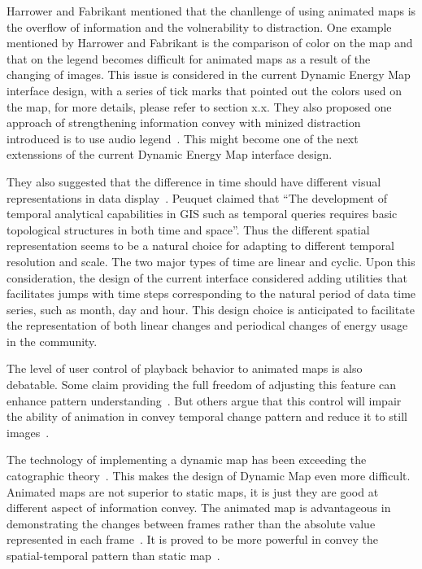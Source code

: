 \documentclass[hidelinks,12pt]{article}
\begin{document}
Harrower and Fabrikant mentioned that the chanllenge of using animated
maps is the overflow of information and the volnerability to
distraction. One example mentioned by Harrower and Fabrikant is the
comparison of color on the map and that on the legend becomes
difficult for animated maps as a result of the changing of
images. This issue is considered in the current Dynamic Energy Map
interface design, with a series of tick marks that pointed out the
colors used on the map, for more details, please refer to section x.x.
They also proposed one approach of strengthening information convey
with minized distraction introduced is to use audio
legend~\cite{Harrower2008}. This might become one of the next
extenssions of the current Dynamic Energy Map interface design.

They also suggested that the difference in time should have different
visual representations in data display~\cite{Harrower2008}. Peuquet
claimed that ``The development of temporal analytical capabilities in
GIS such as temporal queries requires basic topological structures in
both time and space''. Thus the different spatial representation seems
to be a natural choice for adapting to different temporal resolution
and scale. The two major types of time are linear and cyclic. Upon
this consideration, the design of the current interface considered
adding utilities that facilitates jumps with time steps corresponding
to the natural period of data time series, such as month, day and
hour. This design choice is anticipated to facilitate the
representation of both linear changes and periodical changes of energy
usage in the community.

The level of user control of playback behavior to animated maps is
also debatable. Some claim providing the full freedom of adjusting
this feature can enhance pattern understanding~\cite{Nelson1998}. But
others argue that this control will impair the ability of animation in
convey temporal change pattern and reduce it to still
images~\cite{Lowe2004}.

The technology of implementing a dynamic map has been exceeding the
catographic theory~\cite{Harrower2008}. This makes the design of
Dynamic Map even more difficult. Animated maps are not superior to
static maps, it is just they are good at different aspect of
information convey. The animated map is advantageous in demonstrating
the changes between frames rather than the absolute value represented
in each frame~\cite{Dorling1992}. It is proved to be more powerful in
convey the spatial-temporal pattern than static
map~\cite{McEachern1998}.
\end{document}
